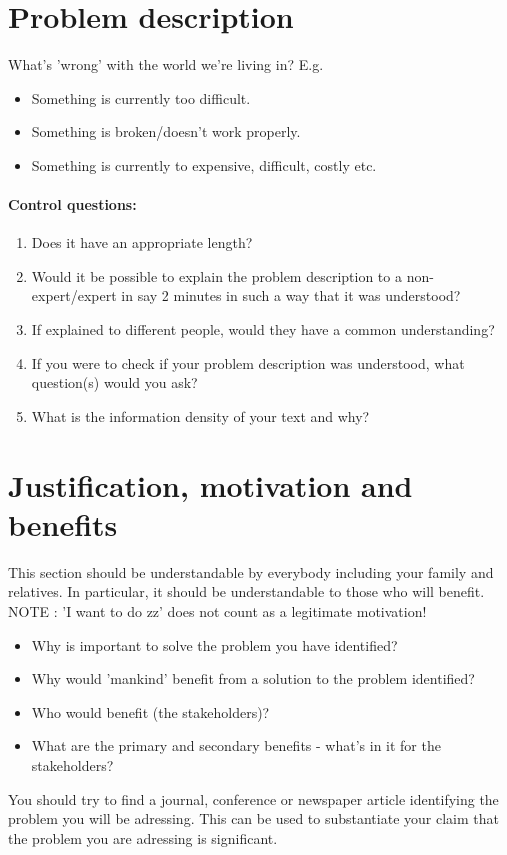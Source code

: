 \documentclass[informationsecurity]{gucmasterproject}
\begin{document}
\section{Problem description}
What's 'wrong' with the world we're living in? E.g.
\begin{itemize}
\item   Something is currently too difficult.
\item   Something is broken/doesn't work properly.
\item   Something is currently to expensive, difficult, costly etc.
\end{itemize}

\paragraph{Control questions:}
\begin{enumerate}
\item Does it have an appropriate length?
\item Would it be possible to explain the problem description to a non-expert/expert in say 2 minutes in such a way that it was understood?
\item If explained to different people, would they have a common understanding?
\item If you were to check if your problem description was understood, what question(s) would you ask?
\item What is the information density of your text and why?
\end{enumerate}

\section{Justification, motivation and benefits}
This section should be understandable by everybody including your family and relatives.
In particular, it should be understandable to those who will benefit.
NOTE : 'I want to do zz' does not count as a legitimate motivation!
\begin{itemize}
\item Why is important to solve the problem you have identified?
\item Why would 'mankind' benefit from a solution to the problem identified?
\item Who would benefit (the stakeholders)?
\item What are the primary and secondary benefits - what's in it for the stakeholders?
\end{itemize}
You should try to find a journal, conference or newspaper article identifying the problem you will be adressing.
This can be used to substantiate your claim that the problem you are adressing is significant.
\end{document}
